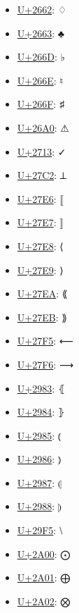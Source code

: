 \begin{itemize}
	\item \href{https://decodeunicode.org/en/u+2662}{U+2662}: ♢
	\item \href{https://decodeunicode.org/en/u+2663}{U+2663}: ♣
	\item \href{https://decodeunicode.org/en/u+266D}{U+266D}: ♭
	\item \href{https://decodeunicode.org/en/u+266E}{U+266E}: ♮
	\item \href{https://decodeunicode.org/en/u+266F}{U+266F}: ♯
	\item \href{https://decodeunicode.org/en/u+26A0}{U+26A0}: ⚠
	\item \href{https://decodeunicode.org/en/u+2713}{U+2713}: ✓
	\item \href{https://decodeunicode.org/en/u+27C2}{U+27C2}: ⟂
	\item \href{https://decodeunicode.org/en/u+27E6}{U+27E6}: ⟦
	\item \href{https://decodeunicode.org/en/u+27E7}{U+27E7}: ⟧
	\item \href{https://decodeunicode.org/en/u+27E8}{U+27E8}: ⟨
	\item \href{https://decodeunicode.org/en/u+27E9}{U+27E9}: ⟩
	\item \href{https://decodeunicode.org/en/u+27EA}{U+27EA}: ⟪
	\item \href{https://decodeunicode.org/en/u+27EB}{U+27EB}: ⟫
	\item \href{https://decodeunicode.org/en/u+27F5}{U+27F5}: ⟵
	\item \href{https://decodeunicode.org/en/u+27F6}{U+27F6}: ⟶
	\item \href{https://decodeunicode.org/en/u+2983}{U+2983}: ⦃
	\item \href{https://decodeunicode.org/en/u+2984}{U+2984}: ⦄
	\item \href{https://decodeunicode.org/en/u+2985}{U+2985}: ⦅
	\item \href{https://decodeunicode.org/en/u+2986}{U+2986}: ⦆
	\item \href{https://decodeunicode.org/en/u+2987}{U+2987}: ⦇
	\item \href{https://decodeunicode.org/en/u+2988}{U+2988}: ⦈
	\item \href{https://decodeunicode.org/en/u+29F5}{U+29F5}: ⧵
	\item \href{https://decodeunicode.org/en/u+2A00}{U+2A00}: ⨀
	\item \href{https://decodeunicode.org/en/u+2A01}{U+2A01}: ⨁
	\item \href{https://decodeunicode.org/en/u+2A02}{U+2A02}: ⨂

\end{itemize}
